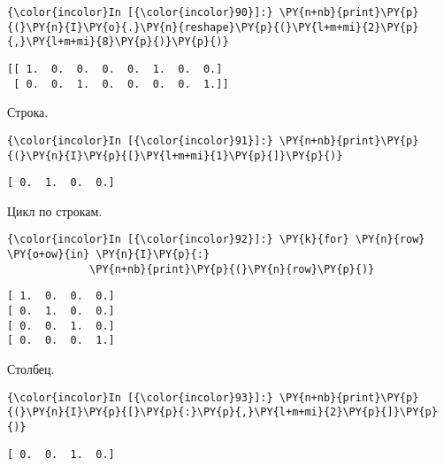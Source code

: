     \begin{Verbatim}[commandchars=\\\{\}]
{\color{incolor}In [{\color{incolor}90}]:} \PY{n+nb}{print}\PY{p}{(}\PY{n}{I}\PY{o}{.}\PY{n}{reshape}\PY{p}{(}\PY{l+m+mi}{2}\PY{p}{,}\PY{l+m+mi}{8}\PY{p}{)}\PY{p}{)}
\end{Verbatim}

    \begin{Verbatim}[commandchars=\\\{\}]
[[ 1.  0.  0.  0.  0.  1.  0.  0.]
 [ 0.  0.  1.  0.  0.  0.  0.  1.]]

    \end{Verbatim}

    Строка.

    \begin{Verbatim}[commandchars=\\\{\}]
{\color{incolor}In [{\color{incolor}91}]:} \PY{n+nb}{print}\PY{p}{(}\PY{n}{I}\PY{p}{[}\PY{l+m+mi}{1}\PY{p}{]}\PY{p}{)}
\end{Verbatim}

    \begin{Verbatim}[commandchars=\\\{\}]
[ 0.  1.  0.  0.]

    \end{Verbatim}

    Цикл по строкам.

    \begin{Verbatim}[commandchars=\\\{\}]
{\color{incolor}In [{\color{incolor}92}]:} \PY{k}{for} \PY{n}{row} \PY{o+ow}{in} \PY{n}{I}\PY{p}{:}
             \PY{n+nb}{print}\PY{p}{(}\PY{n}{row}\PY{p}{)}
\end{Verbatim}

    \begin{Verbatim}[commandchars=\\\{\}]
[ 1.  0.  0.  0.]
[ 0.  1.  0.  0.]
[ 0.  0.  1.  0.]
[ 0.  0.  0.  1.]

    \end{Verbatim}

    Столбец.

    \begin{Verbatim}[commandchars=\\\{\}]
{\color{incolor}In [{\color{incolor}93}]:} \PY{n+nb}{print}\PY{p}{(}\PY{n}{I}\PY{p}{[}\PY{p}{:}\PY{p}{,}\PY{l+m+mi}{2}\PY{p}{]}\PY{p}{)}
\end{Verbatim}

    \begin{Verbatim}[commandchars=\\\{\}]
[ 0.  0.  1.  0.]

    \end{Verbatim}

